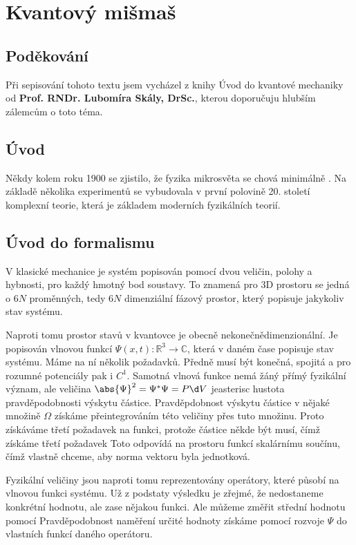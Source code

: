 \documentclass[fykos]{fksgeneric}
\begin{document}
\newtheorem{definice}{Definice}
\newtheorem{veta}{Věta}

\hspace{2cm}
\section{Kvantový mišmaš}
\hspace{2cm}
\subsection{Poděkování}
Při sepisování tohoto textu jsem vycházel z knihy Úvod do kvantové mechaniky od
\textbf{Prof. RNDr. Lubomíra Skály, DrSc.}, kterou doporučuju hlubším zálemcům o toto téma.
\subsection{Úvod}
Někdy kolem roku 1900 se zjistilo, že fyzika mikrosvěta se chová minimálně .
Na základě několika experimentů se vybudovala v první polovině 20. století komplexní teorie, která je základem moderních fyzikálních teorií.

\subsection{Úvod do formalismu}
V klasické mechanice je systém popisován pomocí dvou veličin, polohy a hybnosti, pro každý hmotný bod soustavy. To znamená pro 3D prostoru se jedná o $6N$ proměnných, 
tedy $6N$ dimenziální fázový prostor, který popisuje jakykoliv stav systému.

Naproti tomu prostor stavů v kvantovce je obecně nekonečnědimenzionální. Je popisován vlnovou funkcí $\Psi(x,t): \mathbb{R}^3 \rightarrow \mathbb{C}$, která v daném čase popisuje stav systému. Máme na ní několik požadavků. Předně musí být konečná, spojitá a pro rozumné potenciály pak i $C^1$. Samotná vlnová funkce nemá žáný přímý fyzikální význam, ale veličina $\abs{\Psi}^2 = \Psi^\ast\Psi = P\d V$ jeasterisc hustota pravděpodobnosti výskytu částice. Pravděpdobnost výskytu částice v nějaké množině $\Omega$ získáme přeintegrováním této veličiny přes tuto množinu. Proto získáváme třetí požadavek na
funkci, protože částice někde být musí, čímž získáme třetí požadavek
Toto odpovídá na prostoru funkcí skalárnímu součínu, čímž vlastně chceme, aby norma vektoru byla jednotková.

Fyzikální veličiny jsou naproti tomu reprezentovány operátory, které působí na vlnovou funkci systému. Už z podstaty výsledku je zřejmé, že nedostaneme konkrétní hodnotu, ale
zase nějakou funkci. Ale můžeme změřit střední hodnotu pomocí
Pravděpodobnost naměření určité hodnoty získáme pomocí rozvoje $\Psi$ do vlastních funkcí daného operátoru.
\end{document}
